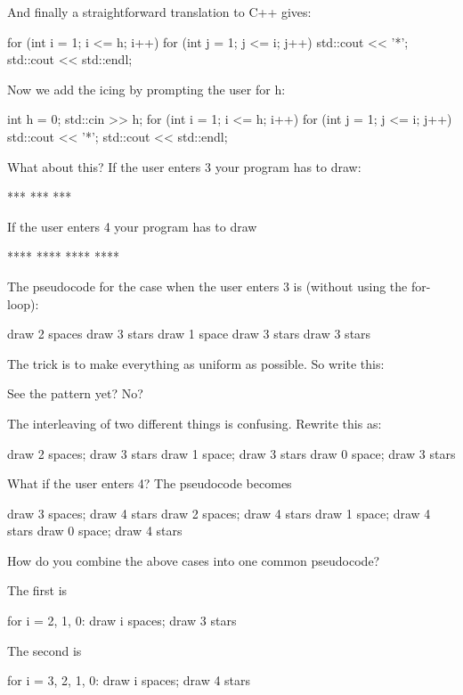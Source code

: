 \begin{console}
And finally a straightforward translation to C++ gives:
\begin{console}
for (int i = 1; i <= h; i++)
{   
    for (int j = 1; j <= i; j++)
    {
        std::cout << '*';
    }
    std::cout << std::endl;
}
\end{console}
Now we add the icing by prompting the user for h:
\begin{console}
int h = 0;
std::cin >> h;
for (int i = 1; i <= h; i++)
{   
    for (int j = 1; j <= i; j++)
    {   
        std::cout << '*';
    }
std::cout << std::endl;
}
\end{console}

\newpage{}

What about this? If the user enters 3 your program has to draw:
\begin{console}
  ***
 ***
***
\end{console}
If the user enters 4 your program has to draw
\begin{console}
   ****
  ****
 ****
****
\end{console}
The pseudocode for the case when the user enters 3 is (without using the
for-loop):
\begin{console}
draw 2 spaces
draw 3 stars
draw 1 space
draw 3 stars
draw 3 stars
\end{console}
The trick is to make everything as uniform as possible. So write this:
See the pattern yet? No?

The interleaving of two different things is confusing. Rewrite this as:
\begin{console}
draw 2 spaces; draw 3 stars
draw 1 space; draw 3 stars
draw 0 space; draw 3 stars
\end{console}
What if the user enters 4? The pseudocode becomes
\begin{console}
draw 3 spaces; draw 4 stars
draw 2 spaces; draw 4 stars
draw 1 space; draw 4 stars
draw 0 space; draw 4 stars
\end{console}
How do you combine the above cases into one common pseudocode?

The first is
\begin{console}
for i = 2, 1, 0:
        draw i spaces; draw 3 stars
\end{console}
The second is
\begin{console}
for i = 3, 2, 1, 0:
        draw i spaces; draw 4 stars
\end{console}


\end{console}

